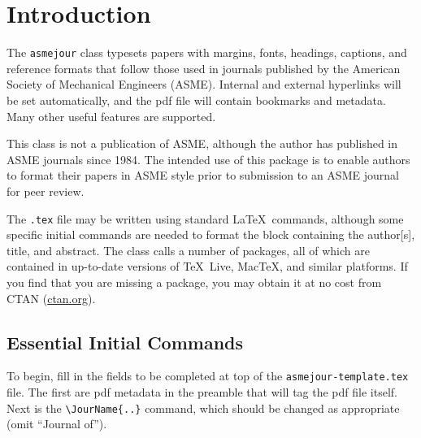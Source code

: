 \documentclass[subscriptcorrection,upint,varvw,barcolor=Goldenrod3,mathalfa=cal=euler,balance,hyphenate,french,pdf-a]{asmejour} %
\begin{document}
\date{Version \versionno, \today}%

\maketitle %


\section{Introduction}

The \texttt{asmejour} class typesets papers with margins, fonts, headings, captions, and reference formats that follow those used in journals published by the American Society of Mechanical Engineers (ASME). Internal and external hyperlinks will be set automatically, and the pdf file will contain bookmarks and metadata. Many other useful features are supported. 

This class is not a publication of ASME, although the author has published in ASME journals since 1984. The intended use of this package is to enable authors to format their papers in ASME style prior to submission to an ASME journal for peer review.

The \texttt{.tex} file may be written using standard \LaTeX\ commands, although some specific initial commands are needed to format the block containing the author[s], title, and abstract. The class calls a number of packages, all of which are contained in up-to-date versions of \TeX~Live, Mac\TeX, and similar platforms. If you find that you are missing a package, you may obtain it at no cost from CTAN (\href{http://ctan.org}{ctan.org}). 

\subsection{Essential Initial Commands}
To begin, fill in the fields to be completed at top of the \texttt{asmejour-template.tex} file. The first are pdf metadata in the preamble that will tag the pdf file itself. Next is the \verb|\JourName{..}| command, which should be changed as appropriate (omit ``Journal of'').
\end{document}
